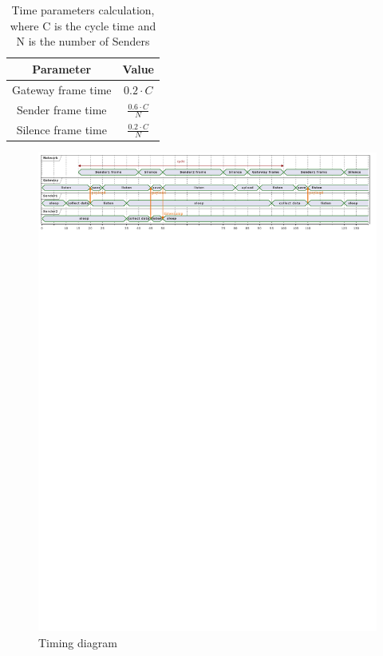 \begin{table}[ht]
    \centering
    \setlength{\extrarowheight}{5pt}
    \begin{tabular}{ |c|c| }
        \hline
        Parameter & Value\\
        \hline
        Gateway frame time & $0.2 \cdot C$\\
        Sender frame time & $\frac{0.6 \cdot C}{N}$\\
        Silence frame time & $\frac{0.2 \cdot C}{N}$\\
        \hline
    \end{tabular}
    \caption{Time parameters calculation, where C is the cycle time and N is the number of Senders}
    \label{timing table}
\end{table}

\begin{figure}
    \centering
    \includegraphics[clip, trim=0cm 25.2cm 0cm 0cm, width=1.0\textwidth]{uml/timings.pdf}
    \caption{Timing diagram}
    \label{timing diagram}
\end{figure}

